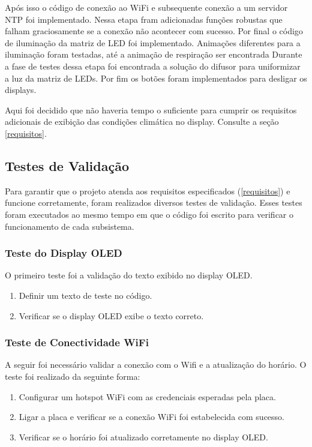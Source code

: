 \documentclass[12pt]{article}
\begin{document}
Após isso o código de conexão ao WiFi e subsequente conexão a um servidor NTP foi implementado. Nessa etapa fram adicionadas funções robustas que falham graciosamente se a conexão não acontecer com sucesso.
Por final o código de iluminação da matriz de LED foi implementado. Animações diferentes para a iluminação foram testadas, até a animação de respiração \cite{thingpulse} ser encontrada Durante a fase de testes dessa etapa foi encontrada a solução do difusor para uniformizar a luz da matriz de LEDs. 
Por fim os botões foram implementados para desligar os displays.

Aqui foi decidido que não haveria tempo o suficiente para cumprir os requisitos adicionais de exibição das condições climática no display. Consulte a seção \ref{requisitos}.

\subsection{Testes de Validação}

Para garantir que o projeto atenda aos requisitos especificados (\ref{requisitos}) e funcione corretamente, foram realizados diversos testes de validação. Esses testes foram executados ao mesmo tempo em que o código foi escrito para verificar o funcionamento de cada subsistema.

\subsubsection{Teste do Display OLED}
O primeiro teste foi a validação do texto exibido no display OLED.
\begin{enumerate}
    \item Definir um texto de teste no código.
    \item Verificar se o display OLED exibe o texto correto.
\end{enumerate}

\subsubsection{Teste de Conectividade WiFi}
A seguir foi necessário validar a conexão com o Wifi e a atualização do horário. O teste foi realizado da seguinte forma:
\begin{enumerate}
    \item Configurar um hotspot WiFi com as credenciais esperadas pela placa.
    \item Ligar a placa e verificar se a conexão WiFi foi estabelecida com sucesso.
    \item Verificar se o horário foi atualizado corretamente no display OLED.
\end{enumerate}
\end{document}
